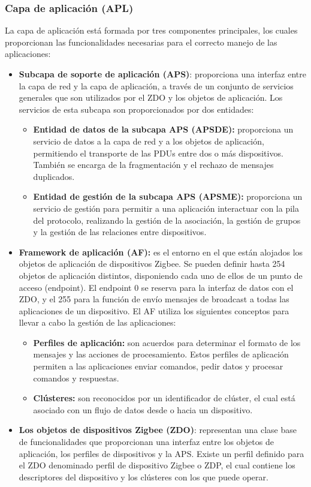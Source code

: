 \subsubsection{{\large Capa de aplicación (APL)}} %
La capa de aplicación está formada por tres componentes principales, los cuales proporcionan las funcionalidades necesarias para el correcto manejo de las aplicaciones:
\begin{itemize}
\item{\bf Subcapa de soporte de aplicación (APS)}: proporciona una interfaz entre la capa de red y la capa de aplicación, a través de un conjunto de servicios generales que son utilizados por el ZDO y los objetos de aplicación. Los servicios de esta subcapa son proporcionados por dos entidades:
	\begin{itemize}
	\item{\bf Entidad de datos de la subcapa APS (APSDE):} proporciona un servicio de datos a la capa de red y a los objetos de aplicación, permitiendo el transporte de las PDUs entre dos o más dispositivos. También se encarga de la fragmentación y el rechazo de mensajes duplicados.
	\item{\bf Entidad de gestión de la subcapa APS (APSME):} proporciona un servicio de gestión para permitir a una aplicación interactuar con la pila del protocolo, realizando la gestión de la asociación, la gestión de grupos y la gestión de las relaciones entre dispositivos.
	\end{itemize}
\item{\bf Framework de aplicación (AF):} es el entorno en el que están alojados los objetos de aplicación de dispositivos Zigbee. Se pueden definir hasta 254 objetos de aplicación distintos, disponiendo cada uno de ellos de un punto de acceso (endpoint). El endpoint 0 se reserva para la interfaz de datos con el ZDO, y el 255 para la función de envío mensajes de broadcast a todas las aplicaciones de un dispositivo.
El AF utiliza los siguientes conceptos para llevar a cabo la gestión de las aplicaciones:
	\begin{itemize}
	\item{\bf Perfiles de aplicación:} son acuerdos para determinar el formato de los mensajes y las acciones de procesamiento. Estos perfiles de aplicación permiten a las aplicaciones enviar comandos, pedir datos y procesar comandos y respuestas.
	\item{\bf Clústeres:} son reconocidos por un identificador de clúster, el cual está asociado con un flujo de datos desde o hacia un dispositivo.
	\end{itemize}
\item{\bf Los objetos de dispositivos Zigbee (ZDO)}: representan una clase base de funcionalidades que proporcionan una interfaz entre los objetos de aplicación, los perfiles de dispositivos y la APS. Existe un perfil definido para el ZDO denominado perfil de dispositivo Zigbee o ZDP, el cual contiene los descriptores del dispositivo y los clústeres con los que puede operar.
\end{itemize}
\clearpage




